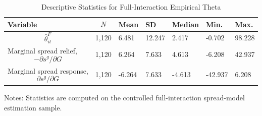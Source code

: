 \begin{table}[H]\centering
\begin{threeparttable}
\caption{Descriptive Statistics for Full-Interaction Empirical Theta}
\label{tab:theta_descriptive_stats}
\scriptsize
\begin{tabularx}{\textwidth}{lYYYYYY}
\toprule
Variable & $$N$$ & Mean & SD & Median & Min. & Max. \\
\midrule
$$\widehat{\theta}^{F}_{it}$$ & 1,120 & 6.481 & 12.247 & 2.417 & -0.702 & 98.228 \\
Marginal spread relief, $$-\partial s^g/\partial G$$ & 1,120 & 6.264 & 7.633 & 4.613 & -6.208 & 42.937 \\
Marginal spread response, $$\partial s^g/\partial G$$ & 1,120 & -6.264 & 7.633 & -4.613 & -42.937 & 6.208 \\
\bottomrule
\end{tabularx}
\begin{tablenotes}[flushleft]\footnotesize
\item Notes: Statistics are computed on the controlled full-interaction spread-model estimation sample.
\end{tablenotes}
\end{threeparttable}
\end{table}
